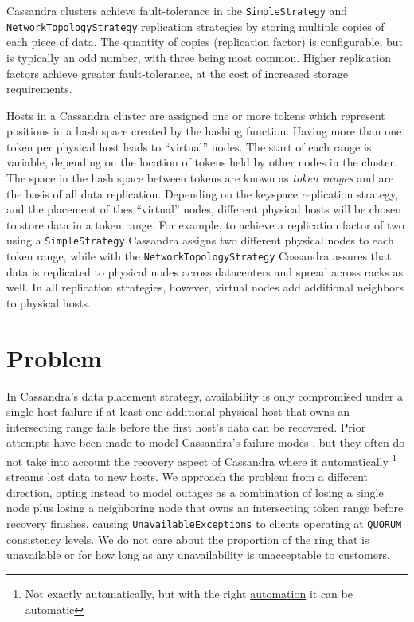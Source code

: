 \documentclass{article}
\begin{document}
Cassandra clusters achieve fault-tolerance in the \texttt{SimpleStrategy}
and \\
\texttt{NetworkTopologyStrategy} replication strategies by storing multiple
copies of each piece of data. The quantity of copies (replication factor) is
configurable, but is typically an odd number, with three being most common.
Higher replication factors achieve greater fault-tolerance, at the cost of
increased storage requirements.

Hosts in a Cassandra cluster are assigned one or more tokens which represent
positions in a hash space created by the hashing function. Having more than
one token per physical host leads to ``virtual'' nodes. The start of each
range is variable, depending on the location of tokens held by other nodes
in the cluster. The space in the hash space between tokens are known as
\textit{token ranges} and are the basis of all data replication. Depending on
the keyspace replication strategy, and the placement of thes ``virtual'' nodes,
different physical hosts will be chosen to store data in a token range.
For example, to achieve a replication factor of two using a
\texttt{SimpleStrategy} Cassandra assigns two different physical nodes to
each token range, while with the \texttt{NetworkTopologyStrategy} Cassandra
assures that data is replicated to physical nodes across datacenters and
spread across racks as well. In all replication strategies, however, virtual
nodes add additional neighbors to physical hosts.

\section{Problem}
\label{sec:problem}

In Cassandra's data placement strategy, availability is only compromised under
a single host failure if at least one additional physical host that owns an
intersecting range fails before the first host's data can be recovered. Prior
attempts have been made to model Cassandra's failure modes \cite{dataloss},
but they often do not take into account the recovery aspect of Cassandra where
it automatically \footnote{Not exactly automatically, but with the right
\href{https://github.com/Netflix/Priam}{automation} it can be automatic}
streams lost data to new hosts. We approach the problem from a different
direction, opting instead to model outages as a combination of losing a single
node plus losing a neighboring node that owns an intersecting token range
before recovery finishes, causing \texttt{UnavailableExceptions} to clients
operating at \texttt{QUORUM} consistency levels. We do not care about the
proportion of the ring that is unavailable or for how long as any
unavailability is unacceptable to customers.
\end{document}
